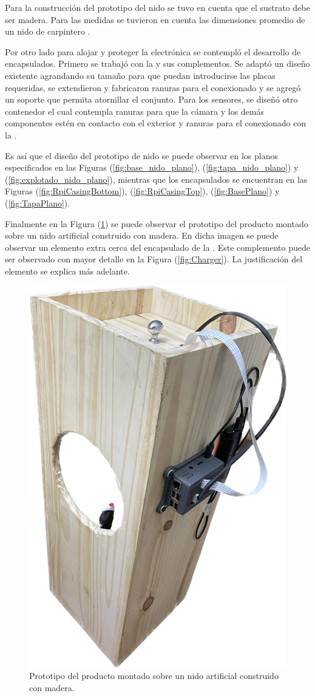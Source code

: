 \label{subsection:nido-sustrato}
Para la construcción del prototipo del nido se tuvo en cuenta que el sustrato debe ser madera. Para las medidas se tuvieron en cuenta las dimensiones promedio de un nido de carpintero \cite{ref:PaperValeriaOjeda}.

Por otro lado para alojar y proteger la electrónica se contempló el desarrollo de encapsulados. Primero se trabajó con la \rspi y sus complementos. Se adaptó un diseño existente agrandando su tamaño para que puedan introducirse las placas requeridas, se extendieron y fabricaron ranuras para el conexionado y se agregó un soporte que permita atornillar el conjunto. Para los sensores, se diseñó otro contenedor el cual contempla ranuras para que la cámara y los demás componentes estén en contacto con el exterior y ranuras para el conexionado con la \rpi.

Es así que el diseño del prototipo de nido se puede observar en los planos especificados en las Figuras (\ref{fig:base_nido_plano}), (\ref{fig:tapa_nido_plano}) y (\ref{fig:explotado_nido_plano}), mientras que los encapsulados se encuentran en las Figuras (\ref{fig:RpiCasingBottom}), (\ref{fig:RpiCasingTop}), (\ref{fig:BasePlano}) y (\ref{fig:TapaPlano}).

Finalmente en la Figura (\ref{fig:caja_prototipo}) se puede observar el prototipo del producto montado sobre un nido artificial construido con madera. En dicha imagen se puede observar un elemento extra cerca del encapsulado de la \rspi. Este complemento puede ser observado con mayor detalle en la Figura (\ref{fig:Charger}). La justificación del elemento se explica más adelante.
\begin{figure}[H]
	\centering	\includegraphics[width=0.4\linewidth,page=1]{ImagenesConstruccion del prototipo/caja_prototipo_2}		
	\caption{Prototipo del producto montado sobre un nido artificial construido con madera.}
	\label{fig:caja_prototipo}
\end{figure}

